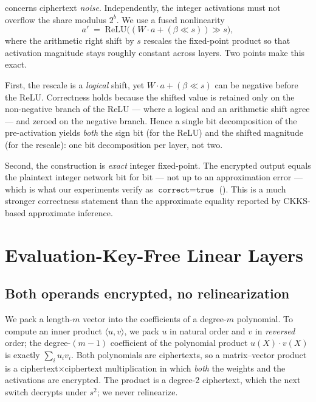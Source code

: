 \documentclass[11pt]{article}
\theoremstyle{plain}
\theoremstyle{definition}
\theoremstyle{remark}
\newcommand{\ReLU}{\mathrm{ReLU}}
\begin{document}
 concerns ciphertext \emph{noise}. Independently, the integer
activations must not overflow the share modulus $2^b$. We use a fused
nonlinearity
\begin{equation}\label{eq:fused}
a' \;=\; \ReLU\!\big((W\!\cdot\! a + (\beta \ll s)) \gg s\big),
\end{equation}
where the arithmetic right shift by $s$ rescales the fixed-point product so
that activation magnitude stays roughly constant across layers. Two points
make this exact.

First, the rescale is a \emph{logical} shift, yet $W\!\cdot\!a+(\beta\ll s)$
can be negative before the ReLU. Correctness holds because the shifted value
is retained only on the non-negative branch of the ReLU --- where a logical
and an arithmetic shift agree --- and zeroed on the negative branch. Hence a
single bit decomposition of the pre-activation yields \emph{both} the sign
bit (for the ReLU) and the shifted magnitude (for the rescale): one bit
decomposition per layer, not two.

Second, the construction is \emph{exact} integer fixed-point. The encrypted
output equals the plaintext integer network bit for bit --- not up to an
approximation error --- which is what our experiments verify as
$\texttt{correct}=\texttt{true}$ (). This is a much stronger
correctness statement than the approximate equality reported by
CKKS-based approximate inference.

\section{Evaluation-Key-Free Linear Layers}\label{sec:fhe}

\subsection{Both operands encrypted, no relinearization}

We pack a length-$m$ vector into the coefficients of a degree-$m$ polynomial.
To compute an inner product $\langle u, v\rangle$, we pack $u$ in natural
order and $v$ in \emph{reversed} order; the degree-$(m-1)$ coefficient of the
polynomial product $u(X)\cdot v(X)$ is exactly $\sum_i u_i v_i$. Both
polynomials are ciphertexts, so a matrix--vector product is a
ciphertext$\times$ciphertext multiplication in which \emph{both} the weights
and the activations are encrypted. The product is a degree-2 ciphertext,
which the next switch decrypts under $s^2$; we never relinearize.
\end{document}
